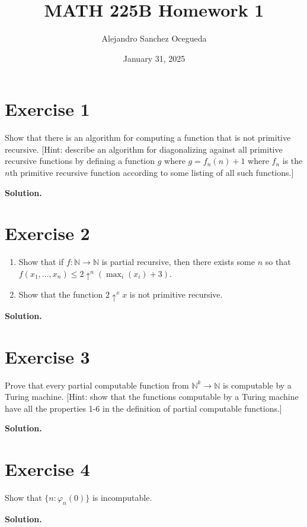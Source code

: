 \documentclass{article}
\title{MATH 225B Homework 1}
\author{Alejandro Sanchez Ocegueda}
\date{January 31, 2025}
\newcommand{\nat}{\mathbb{N}}
\newcommand{\solution}{\noindent \textbf{Solution.}}
\begin{document}
\maketitle

\section*{Exercise 1}
Show that there is an algorithm for computing a function that is not primitive recursive.
[Hint: describe an algorithm for diagonalizing against all primitive recursive functions by defining a function $g$ where $g = f_n(n) + 1$ where $f_n$ is the $n$th primitive recursive function according to some listing of all such functions.]


\solution

\section*{Exercise 2}
\begin{enumerate}
    \item Show that if $f:\nat \to \nat$ is partial recursive, then there exists some $n$ so that $f(x_1, ..., x_n) \leq 2 \uparrow^n(\max_i(x_i)+3)$.
    \item Show that the function $2\uparrow^x x$ is not primitive recursive.
\end{enumerate}

\solution

\section*{Exercise 3}
Prove that every partial computable function from $\nat^k \to \nat$ is computable by a Turing machine.
[Hint: show that the functions computable by a Turing machine have all the properties 1-6 in the definition of partial computable functions.]

\solution

\section*{Exercise 4}
Show that $\{n: \varphi_n(0)\}$ is incomputable.

\solution
\end{document}

